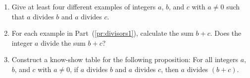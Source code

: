\begin{prog}\label{pr:divisors} \hfill
\begin{enumerate}
\item Give at least four different examples of integers  $a$, $b$, and  $c$  with $a \ne 0$ such that  $a$  divides  $b$  and  $a$  divides  $c$.
\label{pr:divisors1}%

\item For each example in Part~(\ref{pr:divisors1}), calculate the sum  $b + c$.  Does the integer  $a$  divide the sum  $b + c$?
\label{pr:divisors2}%

\item Construct a know-show table for the following proposition:  For all integers $a$, $b$, and  $c$  with 
$a \ne 0$, if $a$ divides $b$ and $a$ divides $c$, then $a$ divides $(b + c)$.
\label{pr:divisors3}%
 

\end{enumerate}
\end{prog}
\hbreak

\endinput
